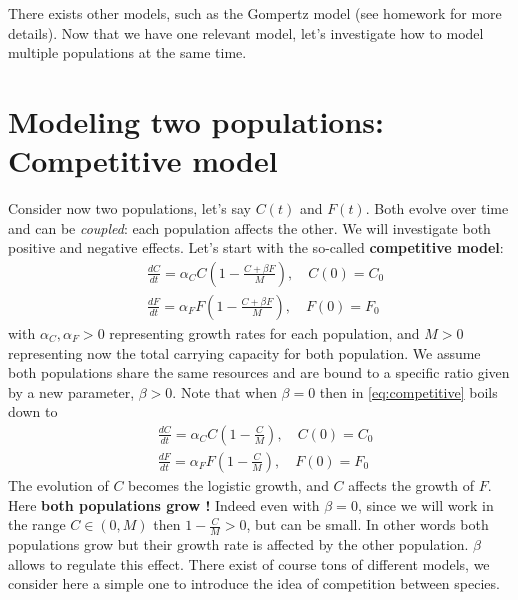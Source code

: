  There exists other models, such as the Gompertz model (see homework for more details). Now that we have one relevant model, let's investigate how to model multiple populations at the same time.
 
 \section{Modeling two populations: Competitive model}
 
 Consider now two populations, let's say $C(t)$ and $F(t)$. Both evolve over time and can be \textit{coupled}: each population affects the other. We will investigate both positive and negative effects. Let's start with the so-called \textbf{competitive model}:
 \begin{equation}\label{eq:competitive}
 \begin{aligned}
&\displaystyle \frac{dC}{dt} = \alpha_C C \left( 1 - \frac{C + \beta F}{M} \right)  ,\quad C(0) = C_0\\ 
&\displaystyle \frac{dF}{dt} = \alpha_F F \left( 1 - \frac{C + \beta F}{M} \right)  ,\quad F(0) = F_0
\end{aligned}
\end{equation}
with $\alpha_C, \alpha_F >0$ representing growth rates for each population, and $M >0$ representing now the total {carrying capacity} for both population. We assume both populations share the same resources and are bound to a specific ratio given by a new parameter, $\beta >0$. Note that when $\beta= 0$ then in \eqref{eq:competitive} boils down to
 \begin{equation}
 \begin{aligned}
&\displaystyle \frac{dC}{dt} = \alpha_C C \left( 1 - \frac{C }{M} \right)  ,\quad C(0) = C_0\\ 
&\displaystyle \frac{dF}{dt} = \alpha_F F \left( 1 - \frac{C }{M} \right)  ,\quad F(0) = F_0
\end{aligned}
\end{equation} 
The evolution of $C$ becomes the logistic growth, and $C$ affects the growth of $F$. Here \textbf{both populations grow !} Indeed even with $\beta = 0$, since we will work in the range $C \in (0, M)$ then $1 - \frac{C}{M} >0$, but can be small. In other words both populations grow but their growth rate is affected by the other population. $\beta$ allows to regulate this effect. There exist of course tons of different models, we consider here a simple one to introduce the idea of competition between species. \\ %

